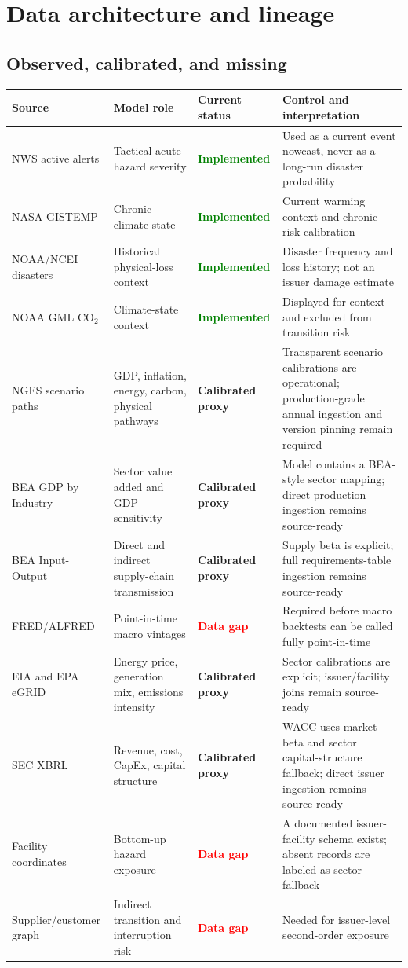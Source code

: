 \documentclass[10pt]{article}
\newcommand{\impl}{\textcolor{green}{\textbf{Implemented}}}
\newcommand{\proxy}{\textcolor{amber}{\textbf{Calibrated proxy}}}
\newcommand{\gap}{\textcolor{red}{\textbf{Data gap}}}
\begin{document}
\section{Data architecture and lineage}

\subsection{Observed, calibrated, and missing}

\begin{longtable}{p{1.10in}p{1.05in}p{0.95in}p{3.10in}}
\toprule
Source & Model role & Current status & Control and interpretation \\
\midrule
\endhead
NWS active alerts & Tactical acute hazard severity & \impl & Used as a current event nowcast, never as a long-run disaster probability \\
NASA GISTEMP & Chronic climate state & \impl & Current warming context and chronic-risk calibration \\
NOAA/NCEI disasters & Historical physical-loss context & \impl & Disaster frequency and loss history; not an issuer damage estimate \\
NOAA GML CO$_2$ & Climate-state context & \impl & Displayed for context and excluded from transition risk \\
NGFS scenario paths & GDP, inflation, energy, carbon, physical pathways & \proxy & Transparent scenario calibrations are operational; production-grade annual ingestion and version pinning remain required \\
BEA GDP by Industry & Sector value added and GDP sensitivity & \proxy & Model contains a BEA-style sector mapping; direct production ingestion remains source-ready \\
BEA Input-Output & Direct and indirect supply-chain transmission & \proxy & Supply beta is explicit; full requirements-table ingestion remains source-ready \\
FRED/ALFRED & Point-in-time macro vintages & \gap & Required before macro backtests can be called fully point-in-time \\
EIA and EPA eGRID & Energy price, generation mix, emissions intensity & \proxy & Sector calibrations are explicit; issuer/facility joins remain source-ready \\
SEC XBRL & Revenue, cost, CapEx, capital structure & \proxy & WACC uses market beta and sector capital-structure fallback; direct issuer ingestion remains source-ready \\
Facility coordinates & Bottom-up hazard exposure & \gap & A documented issuer-facility schema exists; absent records are labeled as sector fallback \\
Supplier/customer graph & Indirect transition and interruption risk & \gap & Needed for issuer-level second-order exposure \\
\bottomrule
\end{longtable}
\end{document}
